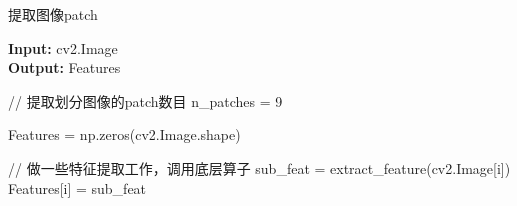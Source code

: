 \documentclass[a4paper,12pt]{article}
\begin{document}
\begin{CJK}{UTF8}{gbsn}
    \begin{algorithm}
        \setcounter{algorithm}{1}
        \caption{提取图像patch}
        \hspace*{0.02in} {\bf Input:} cv2.Image\\
        \hspace*{0.02in} {\bf Output:} Features
        \begin{algorithmic}[1]
            \State // 提取划分图像的patch数目
            \State n\_patches = 9

            \State Features = np.zeros(cv2.Image.shape)

            \State // 做一些特征提取工作，调用底层算子
            \State sub\_feat = extract\_feature(cv2.Image[i])
            \State Features[i] = sub\_feat
            \EndFor
        \end{algorithmic}
    \end{algorithm}
\end{CJK}
\end{document}
